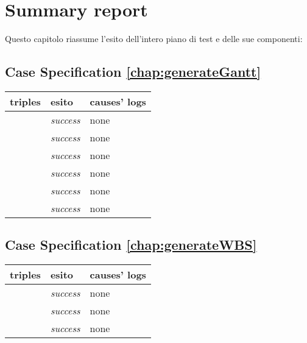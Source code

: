 \chapter{Summary report}
\label{chap:summary_report}

Questo capitolo riassume l'esito dell'intero piano di test e delle sue
componenti:

\section{Case Specification \ref{chap:generateGantt}}

\begin{table}[h!]
  \begin{center}
    \begin{tabular}{| l | l | p{60mm} |}
    \hline
    \textbf{triples} & \textbf{esito} & \textbf{causes' logs} \\
	\hline    
	\nameref{sec:ganttBasicTaskRepresentation} & \emph{success} & none \\
    \hline
	\nameref{sec:ganttComposedTaskRepresentation} & \emph{success} & none \\
    \hline
	\nameref{sec:actualTimeTaskRepresentation} & \emph{success} & none \\
    \hline
    \nameref{sec:identifierNameTaskRepresentation} & \emph{success} & none \\
    \hline
    \nameref{sec:ganttResourcesTaskRepresentation} & \emph{success} & none \\
    \hline
    \nameref{sec:TNDependencyrepresentation} & \emph{success} & none \\
    \hline
    \end{tabular}
  \end{center}
\end{table}

\section{Case Specification \ref{chap:generateWBS}}

\begin{table}[h!]
  \begin{center}
    \begin{tabular}{| l | l | p{60mm} |}
    \hline
    \textbf{triples} & \textbf{esito} & \textbf{causes' logs} \\
	\hline    
	\nameref{sec:WBSTaskRepresentation} & \emph{success} & none \\
    \hline
	\nameref{sec:WBSDimensionRepresentation} & \emph{success} & none \\
    \hline
	\nameref{sec:wbs_compositionRelationsRepresentation} & \emph{success} & none \\
    \hline
    \end{tabular}
  \end{center}
\end{table}

